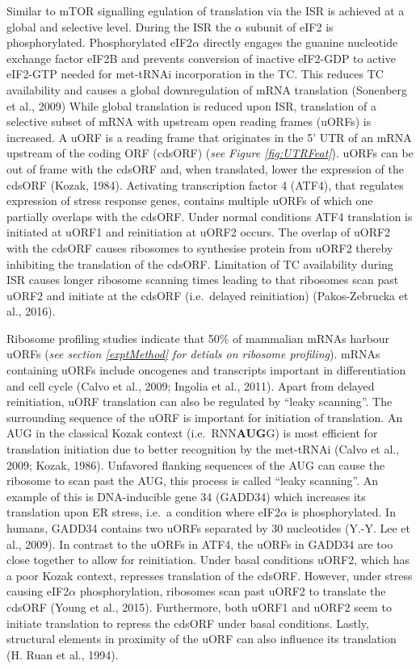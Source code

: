 \documentclass[12pt,openany]{book}
\begin{document}
Similar to mTOR signalling egulation of translation via the ISR is
achieved at a global and selective level. During the ISR the \(\alpha\)
subunit of eIF2 is phosphorylated. Phosphorylated eIF2\(\alpha\)
directly engages the guanine nucleotide exchange factor eIF2B and
prevents conversion of inactive eIF2-GDP to active eIF2-GTP needed for
met-tRNAi incorporation in the TC. This reduces TC availability and
causes a global downregulation of mRNA translation (Sonenberg et al.,
2009) While global translation is reduced upon ISR, translation of a
selective subset of mRNA with upstream open reading frames (uORFs) is
increased. A uORF is a reading frame that originates in the 5' UTR of an
mRNA upstream of the coding ORF (cdsORF) (\emph{see Figure
\ref{fig:UTRFeat}}). uORFs can be out of frame with the cdsORF and, when
translated, lower the expression of the cdsORF (Kozak, 1984). Activating
transcription factor 4 (ATF4), that regulates expression of stress
response genes, contains multiple uORFs of which one partially overlaps
with the cdsORF. Under normal conditions ATF4 translation is initiated
at uORF1 and reinitiation at uORF2 occurs. The overlap of uORF2 with the
cdsORF causes ribosomes to synthesise protein from uORF2 thereby
inhibiting the translation of the cdsORF. Limitation of TC availability
during ISR causes longer ribosome scanning times leading to that
ribosomes scan past uORF2 and initiate at the cdsORF (i.e.~delayed
reinitiation) (Pakos-Zebrucka et al., 2016).

Ribosome profiling studies indicate that 50\% of mammalian mRNAs harbour
uORFs (\emph{see section \ref{exptMethod} for detials on ribosome
profiling}). mRNAs containing uORFs include oncogenes and transcripts
important in differentiation and cell cycle (Calvo et al., 2009; Ingolia
et al., 2011). Apart from delayed reinitiation, uORF translation can
also be regulated by ``leaky scanning''. The surrounding sequence of the
uORF is important for initiation of translation. An AUG in the classical
Kozak context (i.e.~RNN\textbf{AUG}G) is most efficient for translation
initiation due to better recognition by the met-tRNAi (Calvo et al.,
2009; Kozak, 1986). Unfavored flanking sequences of the AUG can cause
the ribosome to scan past the AUG, this process is called ``leaky
scanning''. An example of this is DNA-inducible gene 34 (GADD34) which
increases its translation upon ER stress, i.e.~a condition where
eIF2\(\alpha\) is phosphorylated. In humans, GADD34 contains two uORFs
separated by 30 nucleotides (Y.-Y. Lee et al., 2009). In contrast to the
uORFs in ATF4, the uORFs in GADD34 are too close together to allow for
reinitiation. Under basal conditions uORF2, which has a poor Kozak
context, represses translation of the cdsORF. However, under stress
causing eIF2\(\alpha\) phosphorylation, ribosomes scan past uORF2 to
translate the cdsORF (Young et al., 2015). Furthermore, both uORF1 and
uORF2 seem to initiate translation to repress the cdsORF under basal
conditions. Lastly, structural elements in proximity of the uORF can
also influence its translation (H. Ruan et al., 1994).
\end{document}
